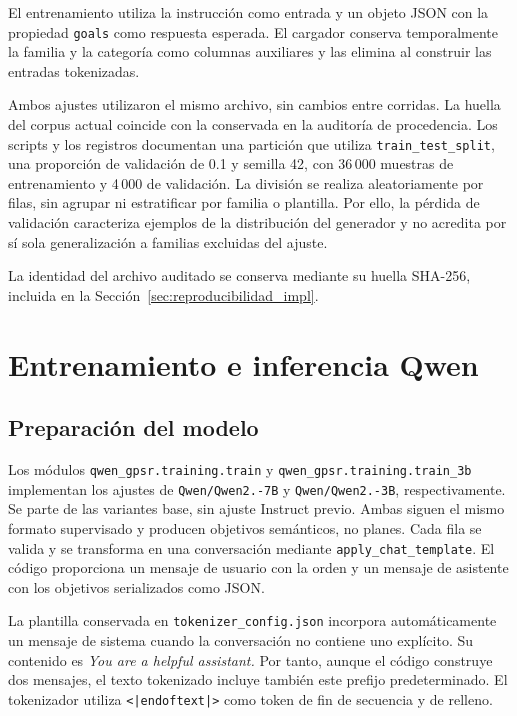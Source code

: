 El entrenamiento utiliza la instrucción como entrada y un objeto JSON
con la propiedad \texttt{goals} como respuesta esperada. El cargador
conserva temporalmente la familia y la categoría como columnas
auxiliares y las elimina al construir las entradas tokenizadas.

Ambos ajustes utilizaron el mismo archivo, sin cambios entre corridas. La huella del
corpus actual coincide con la conservada en la auditoría de procedencia.
Los scripts y los registros documentan una partición que utiliza \texttt{train\_\allowbreak test\_\allowbreak split}, una proporción de
validación de 0.1 y semilla 42, con 36\,000 muestras de entrenamiento
y 4\,000 de validación. La división se realiza aleatoriamente por filas, sin
agrupar ni estratificar por familia o plantilla. Por ello, la pérdida
de validación caracteriza ejemplos de la distribución del generador
y no acredita por sí sola generalización a familias excluidas del ajuste.

La identidad del archivo auditado se conserva mediante su huella
SHA-256, incluida en la Sección~\ref{sec:reproducibilidad_impl}.

\section{Entrenamiento e inferencia Qwen}
\label{sec:implementacion_qwen}

\subsection{Preparación del modelo}

Los módulos \texttt{qwen\_\allowbreak gpsr.\allowbreak training.\allowbreak train} y
\texttt{qwen\_\allowbreak gpsr.\allowbreak training.\allowbreak train\_\allowbreak 3b} implementan los ajustes de
\texttt{Qwen/\allowbreak Qwen2.-\allowbreak 7B} y \texttt{Qwen/\allowbreak Qwen2.-\allowbreak 3B}, respectivamente.
Se parte de las variantes base, sin ajuste Instruct previo.
Ambas siguen el mismo formato supervisado y producen objetivos semánticos,
no planes. Cada fila se valida y se
transforma en una conversación mediante \texttt{apply\_\allowbreak chat\_\allowbreak template}.
El código proporciona un mensaje de usuario con la orden y un mensaje
de asistente con los objetivos serializados como JSON.

La plantilla conservada en \texttt{tokenizer\_\allowbreak config.\allowbreak json} incorpora
automáticamente un mensaje de sistema cuando la conversación no
contiene uno explícito. Su contenido es
\textit{You are a helpful assistant.} Por tanto, aunque el código
construye dos mensajes, el texto tokenizado incluye también este
prefijo predeterminado. El tokenizador utiliza
\texttt{<|endoftext|>} como token de fin de secuencia y de relleno.

